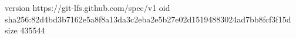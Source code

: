 version https://git-lfs.github.com/spec/v1
oid sha256:82d4bd3b7162e5a8f8a13da3c2eba2e5b27e02d15194883024ad7bb8fcf3f15d
size 435544
